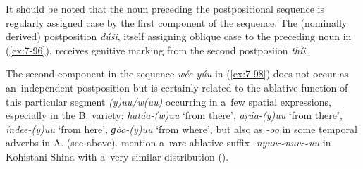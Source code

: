 It should be noted that the noun preceding the postpositional sequence is regularly assigned case by the first component of the sequence. The (nominally derived) postposition \textit{dúši}, itself assigning oblique case to the preceding noun in (\ref{ex:7-96}), receives genitive marking from the second postposiion \textit{thíi}.


The second component in the sequence \textit{wée yúu} in (\ref{ex:7-98}) does not occur as an~independent postposition but is certainly related to the ablative function of this particular segment \textit{(y)uu/w(uu)} occurring in a~few spatial expressions, especially in the B. variety: \textit{hatáa-(w)uu} `from there', \textit{aṛáa-(y)uu} `from there', \textit{índee-(y)uu} `from here', \textit{ɡóo-(y)uu} `from where', but also as \textit{-oo} in some temporal adverbs in A. (see  above). \citeauthor{schmidtkohistani2001} mention a~rare ablative suffix \textit{-nyuu$\sim$nuu$\sim$uu} in Kohistani Shina with a~very similar distribution (\citeyear[130]{schmidtkohistani2001}).